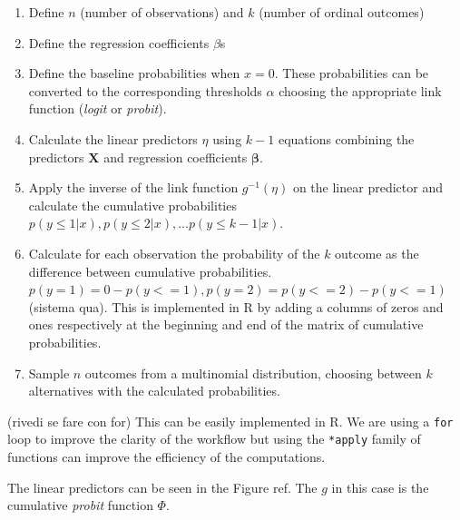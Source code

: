 \documentclass[
  man,floatsintext]{apa6}
\providecommand{\tightlist}{%
  \setlength{\itemsep}{0pt}\setlength{\parskip}{0pt}}
\begin{document}
\begin{enumerate}
\def\labelenumi{\arabic{enumi}.}
\tightlist
\item
  Define \(n\) (number of observations) and \(k\) (number of ordinal outcomes)
\item
  Define the regression coefficients \(\beta\)s
\item
  Define the baseline probabilities when \(x = 0\). These probabilities can be converted to the corresponding thresholds \(\alpha\) choosing the appropriate link function (\emph{logit} or \emph{probit}).
\item
  Calculate the linear predictors \(\eta\) using \(k - 1\) equations combining the predictors \(\mathbf{X}\) and regression coefficients \(\mathbf{\beta}\).
\item
  Apply the inverse of the link function \(g^{-1}(\eta)\) on the linear predictor and calculate the cumulative probabilities \(p(y \leq 1|x), p(y \leq 2|x), ... p(y \leq k - 1|x)\).
\item
  Calculate for each observation the probability of the \(k\) outcome as the difference between cumulative probabilities. \(p(y = 1) = 0 - p(y <= 1), p(y = 2) = p(y <= 2) - p(y <= 1)\) (sistema qua). This is implemented in R by adding a columns of zeros and ones respectively at the beginning and end of the matrix of cumulative probabilities.
\item
  Sample \(n\) outcomes from a multinomial distribution, choosing between \(k\) alternatives with the calculated probabilities.
\end{enumerate}

(rivedi se fare con for)
This can be easily implemented in R. We are using a \texttt{for} loop to improve the clarity of the workflow but using the \texttt{*apply} family of functions can improve the efficiency of the computations.

\scriptsize

\normalsize

The linear predictors can be seen in the Figure ref. The \(g\) in this case is the cumulative \emph{probit} function \(\Phi\).

\scriptsize
\end{document}
